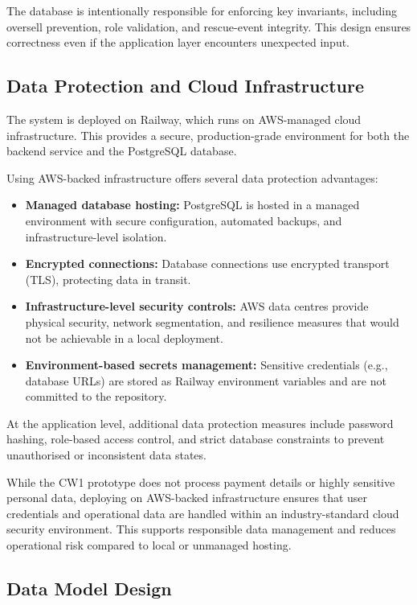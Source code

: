\documentclass[11pt, a4paper]{report}
\begin{document}
The database is intentionally responsible for enforcing key invariants, including oversell prevention, role validation, and rescue-event integrity. This design ensures correctness even if the application layer encounters unexpected input.

\subsection{Data Protection and Cloud Infrastructure}

The system is deployed on Railway, which runs on AWS-managed cloud infrastructure. This provides a secure, production-grade environment for both the backend service and the PostgreSQL database.

Using AWS-backed infrastructure offers several data protection advantages:

\begin{itemize}
\item \textbf{Managed database hosting:} PostgreSQL is hosted in a managed environment with secure configuration, automated backups, and infrastructure-level isolation.
\item \textbf{Encrypted connections:} Database connections use encrypted transport (TLS), protecting data in transit.
\item \textbf{Infrastructure-level security controls:} AWS data centres provide physical security, network segmentation, and resilience measures that would not be achievable in a local deployment.
\item \textbf{Environment-based secrets management:} Sensitive credentials (e.g., database URLs) are stored as Railway environment variables and are not committed to the repository.
\end{itemize}

At the application level, additional data protection measures include password hashing, role-based access control, and strict database constraints to prevent unauthorised or inconsistent data states.

While the CW1 prototype does not process payment details or highly sensitive personal data, deploying on AWS-backed infrastructure ensures that user credentials and operational data are handled within an industry-standard cloud security environment. This supports responsible data management and reduces operational risk compared to local or unmanaged hosting.

\subsection{Data Model Design}
\end{document}
